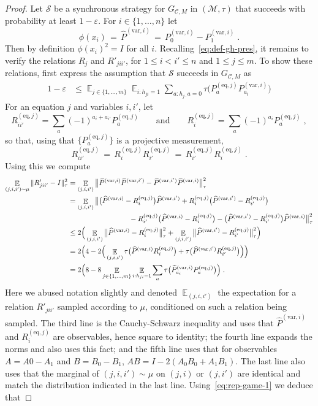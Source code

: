\documentclass[11pt]{article}
\theoremstyle{definition}
\newcommand{\code}{\mathscr{C}}
\newcommand{\strategy}{\mathscr{S}}
\newcommand{\Id}{\ensuremath{I}}
\DeclareMathOperator*{\Expectation}{\mathbb{E}}
\newcommand{\Es}[1]{\Expectation_{#1}}
\newcommand{\mM}{\ensuremath{\mathcal{M}}}
\newcommand{\eps}{\varepsilon}
\newcommand{\eq}{\mathrm{eq}}
\newcommand{\var}{\mathrm{var}}
\begin{document}
\begin{proof}
Let $\strategy$ be a synchronous strategy for $G_{\code,M}$  in  $(\mM,\tau)$ that succeeds with probability at least $1-\eps$. For $i\in\{1,\ldots,n\}$ let 
\[ \phi(x_i)\,=\,{\widehat{P}}^{(\var,i)}\,=\, P^{(\var,i)}_0-P^{(\var,i)}_1\;.\]
Then by definition $\phi(x_i)^2=\Id$ for all $i$. Recalling~\eqref{eq:def-gh-pres}, it remains to verify the relations $R_j$ and $R'_{jii'}$, for $1\leq i<i'\leq n$ and $1\leq j \leq m$. To show these relations, first express the assumption that $\strategy$ succeeds in $G_{\code,M}$ as
\begin{align}
1-\eps &\leq \Es{j\in\{1,\ldots,m\}} \Es{i: h_{ji}=1} \sum_{a:h_{j\cdot} a=0}\tau\big(P^{(\eq,j)}_a P^{(\var,i)}_{a_i}\big)\label{eq:rep-game-1}
\end{align}
For an equation $j$ and variables $i,i'$, let 
\[ R^{(\eq,j)}_{ii'} = \sum_a (-1)^{a_i+a_{i'}} P^{(\eq,j)}_a\qquad\text{and}\qquad R^{(\eq,j)}_{i} = \sum_a (-1)^{a_i}P^{(\eq,j)}_a\;,\]
so that, using that $\{P^{(\eq,j)}_a\}$ is a projective measurement, 
\[R^{(\eq,j)}_{ii'} \,=\, R^{(\eq,j)}_{i}R^{(\eq,j)}_{i'}\,=\,R^{(\eq,j)}_{i'}R^{(\eq,j)}_{i}\;.\]
Using this we compute
\begin{align*}
\Es{(j,i,i')\sim\mu} \|R'_{jii'}-\Id\|_\tau^2 &= \Es{(j,i,i')} \big\| \widehat{P}^{(\var,i)}\widehat{P}^{(\var,i')} - \widehat{P}^{(\var,i')}\widehat{P}^{(\var,i)}\big\|_\tau^2\\
&= \Es{(j,i,i')} \big\| \big(\widehat{P}^{(\var,i)} - R^{(\eq,j)}_{i}\big)\widehat{P}^{(\var,i')} + R^{(\eq,j)}_{i}\big(\widehat{P}^{(\var,i')}-R^{(\eq,j)}_{i'}\big)  \\
&\hskip3cm - R^{(\eq,j)}_{i'}\big(\widehat{P}^{(\var,i)}-R^{(\eq,j)}_{i}\big)- \big(\widehat{P}^{(\var,i')}- R^{(\eq,j)}_{i'}\big)\widehat{P}^{(\var,i)}  \big\|_\tau^2\\
&\leq 2\Big( \Es{(j,i,i')} \big\| \widehat{P}^{(\var,i)} - R^{(\eq,j)}_{i}\big\|_\tau^2 +\Es{(j,i,i')} \big\| \widehat{P}^{(\var,i')} - R^{(\eq,j)}_{i'}\big\|_\tau^2\Big)\\
&= 2\Big(4-2\Big(\Es{(j,i,i')} \tau\big( \widehat{P}^{(\var,i)}  R^{(\eq,j)}_{i}\big) +\tau\big(\widehat{P}^{(\var,i')}  R^{(\eq,j)}_{i'}\big)\Big)\Big)\\
&=2\Big(8-8 \Es{j\in\{1,\ldots,m\}} \Es{i:h_{ji}=1}\sum_{a} \tau\big( \widehat{P}^{(\var,i)}_{a_i}  P^{(\eq,j)}_{a}\big)\Big)\;.
\end{align*}
Here we abused notation slightly and denoted $\Es{(j,i,i')}$ the expectation for a relation $R'_{jii'}$ sampled according to $\mu$, conditioned on such a relation being sampled. The third line is the Cauchy-Schwarz inequality and uses that $\widehat{P}^{(\var,i)}$ and $R^{(\eq,j)}_{i}$ are observables, hence square to identity; the fourth line expands the norms and also uses this fact; and the fifth line uses that for observables $A=A0-A_1$ and $B=B_0-B_1$, $AB=\Id-2(A_0B_0+A_1B_1)$. The last line also uses that the marginal of $(j,i,i')\sim\mu$ on $(j,i)$ or $(j,i')$ are identical and match the distribution indicated in the last line. Using~\eqref{eq:rep-game-1} we deduce that  

\end{proof}
\end{document}
